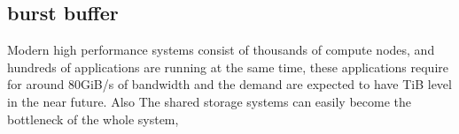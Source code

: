 \subsection{burst buffer}
Modern high performance systems consist of thousands of compute nodes, and hundreds of
applications are running at the same time, these applications require for around 80GiB/s of
bandwidth and the demand are expected to have TiB level in the near future.
Also The shared storage
systems can easily become the bottleneck of the whole system,



